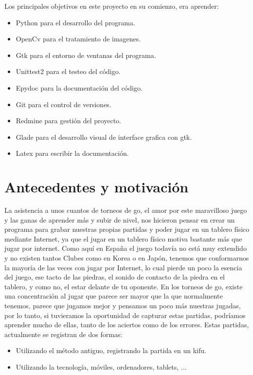 \documentclass[12pt,a4paper]{report}
\begin{document}
Los principales objetivos en este proyecto en su comienzo, era aprender:
\begin{itemize} 
    \item Python para el desarrollo del programa. 
    \item OpenCv para el tratamiento de imagenes. 
    \item Gtk para el entorno de ventanas del programa. 
    \item Unittest2 para el testeo del código. 
    \item Epydoc para la documentación del código. 
    \item Git para el control de versiones. 
    \item Redmine para gestión del proyecto. 
    \item Glade para el desarrollo visual de interface grafica con gtk.
    \item Latex para escribir la documentación. 
\end{itemize}


\chapter{Antecedentes y motivación}

La asistencia a unos cuantos de torneos de go, el amor por este maravilloso
juego y las ganas de aprender más y subir de nivel, nos hicieron pensar en crear
un programa para grabar nuestras propias partidas y poder jugar en un tablero
físico mediante Internet, ya que el jugar en un tablero físico motiva bastante
más que jugar por internet. Como aquí en España el juego todavía no está muy
extendido y no existen tantos Clubes como en Korea o en Japón, tenemos que
conformarnos la mayoría de las veces con jugar por Internet, lo cual pierde un
poco la esencia del juego, ese tacto de las piedras, el sonido de contacto de la
piedra en el tablero, y como no, el estar delante de tu oponente. 
En los torneos de go, existe una concentración al jugar que parece ser mayor que
la que normalmente tenemos, parece que jugamos mejor y pensamos un poco más nuestras
jugadas, por lo tanto, si tuvieramos la oportunidad de capturar estas partidas,
podríamos aprender mucho de ellas, tanto de los aciertos como de los errores. 
Estas partidas, actualmente se registran de dos formas: 
\begin{itemize}
    \item Utilizando el método antiguo, registrando la partida en un kifu. 
    \item Utilizando la tecnología, móviles, ordenadores, tablets, ...
\end{itemize} 
\end{document}
